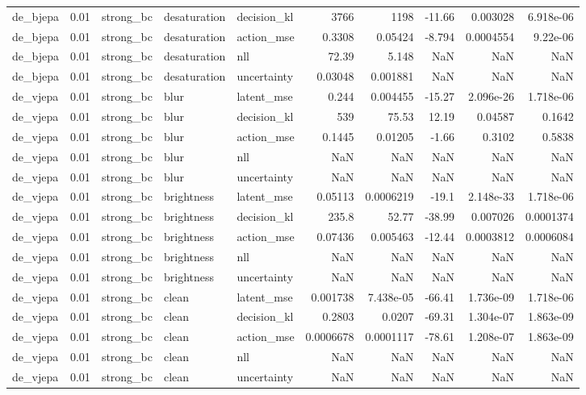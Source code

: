 \begin{tabular}{lrlllrrrrr}
de\_bjepa & 0.01 & strong\_bc & desaturation & decision\_kl & 3766 & 1198 & -11.66 & 0.003028 & 6.918e-06 \\
de\_bjepa & 0.01 & strong\_bc & desaturation & action\_mse & 0.3308 & 0.05424 & -8.794 & 0.0004554 & 9.22e-06 \\
de\_bjepa & 0.01 & strong\_bc & desaturation & nll & 72.39 & 5.148 & NaN & NaN & NaN \\
de\_bjepa & 0.01 & strong\_bc & desaturation & uncertainty & 0.03048 & 0.001881 & NaN & NaN & NaN \\
de\_vjepa & 0.01 & strong\_bc & blur & latent\_mse & 0.244 & 0.004455 & -15.27 & 2.096e-26 & 1.718e-06 \\
de\_vjepa & 0.01 & strong\_bc & blur & decision\_kl & 539 & 75.53 & 12.19 & 0.04587 & 0.1642 \\
de\_vjepa & 0.01 & strong\_bc & blur & action\_mse & 0.1445 & 0.01205 & -1.66 & 0.3102 & 0.5838 \\
de\_vjepa & 0.01 & strong\_bc & blur & nll & NaN & NaN & NaN & NaN & NaN \\
de\_vjepa & 0.01 & strong\_bc & blur & uncertainty & NaN & NaN & NaN & NaN & NaN \\
de\_vjepa & 0.01 & strong\_bc & brightness & latent\_mse & 0.05113 & 0.0006219 & -19.1 & 2.148e-33 & 1.718e-06 \\
de\_vjepa & 0.01 & strong\_bc & brightness & decision\_kl & 235.8 & 52.77 & -38.99 & 0.007026 & 0.0001374 \\
de\_vjepa & 0.01 & strong\_bc & brightness & action\_mse & 0.07436 & 0.005463 & -12.44 & 0.0003812 & 0.0006084 \\
de\_vjepa & 0.01 & strong\_bc & brightness & nll & NaN & NaN & NaN & NaN & NaN \\
de\_vjepa & 0.01 & strong\_bc & brightness & uncertainty & NaN & NaN & NaN & NaN & NaN \\
de\_vjepa & 0.01 & strong\_bc & clean & latent\_mse & 0.001738 & 7.438e-05 & -66.41 & 1.736e-09 & 1.718e-06 \\
de\_vjepa & 0.01 & strong\_bc & clean & decision\_kl & 0.2803 & 0.0207 & -69.31 & 1.304e-07 & 1.863e-09 \\
de\_vjepa & 0.01 & strong\_bc & clean & action\_mse & 0.0006678 & 0.0001117 & -78.61 & 1.208e-07 & 1.863e-09 \\
de\_vjepa & 0.01 & strong\_bc & clean & nll & NaN & NaN & NaN & NaN & NaN \\
de\_vjepa & 0.01 & strong\_bc & clean & uncertainty & NaN & NaN & NaN & NaN & NaN \\

\end{tabular}
